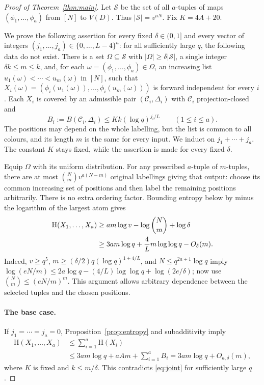 \documentclass[11pt,a4paper]{article}
\numberwithin{equation}{section}
\newcommand{\HH}{\mathrm H}
\newcommand{\cC}{\mathcal C}
\newcommand{\cS}{\mathcal S}
\begin{document}
\begin{proof}[Proof of Theorem~\ref{thm:main}]
Let $\cS$ be the set of all $a$-tuples of maps
$(\phi_1,\ldots,\phi_a)$ from $[N]$ to $V(D)$.
Thus $|\cS|=v^{aN}$.
Fix $K=4A+20$.

We prove the following assertion for every fixed
$\delta\in(0,1]$ and every vector of integers
$(j_1,\ldots,j_a)\in\{0,\ldots,L-4\}^a$:
for all sufficiently large $q$, the following data do not exist.
There is a set $\Omega\subseteq\cS$ with
$|\Omega|\ge\delta|\cS|$, a single integer
$\delta k\le m\le k$, and, for each
$\omega=(\phi_1,\ldots,\phi_a)\in\Omega$, an increasing
list $u_1(\omega)<\cdots<u_m(\omega)$ in $[N]$, such that
$X_i(\omega)=(\phi_i(u_1(\omega)),\ldots,
\phi_i(u_m(\omega)))$ is forward independent for every $i$.
Each $X_i$ is covered by an admissible pair
$(\cC_i,\Delta_i)$ with $\cC_i$ projection-closed and
\begin{equation}\label{eq:bounds}
 B_i:=B(\cC_i,\Delta_i)
 \le Kk(\log q)^{j_i/L}\qquad(1\le i\le a).
\end{equation}
The positions may depend on the whole labelling, but the list
is common to all colours, and its length $m$ is the same for
every input. We induct on $j_1+\cdots+j_a$.
The constant $K$ stays fixed, while the assertion is made for
every fixed $\delta$.

Equip $\Omega$ with its uniform distribution.
For any prescribed $a$-tuple of $m$-tuples, there are at most
$\binom Nm v^{a(N-m)}$ original labellings giving that output:
choose its common increasing set of positions and then label
the remaining positions arbitrarily.
There is no extra ordering factor. Bounding entropy below by
minus the logarithm of the largest atom gives
\begin{align}
 \HH(X_1,\ldots,X_a)
 &\ge am\log v-\log\binom Nm+\log\delta\notag\\
 &\ge3am\log q+\frac4L m\log\log q-O_\delta(m).
 \label{eq:joint}
\end{align}
Indeed, $v\ge q^5$,
$m\ge(\delta/2)q(\log q)^{1+4/L}$, and
$N\le q^{2a+1}\log q$ imply
$\log(eN/m)\le2a\log q-(4/L)\log\log q+\log(2e/\delta)$;
now use $\binom Nm\le(eN/m)^m$.
This argument allows arbitrary dependence between the selected
tuples and the chosen positions.

\paragraph{The base case.}
If $j_1=\cdots=j_a=0$, Proposition~\ref{prop:entropy} and
subadditivity imply
\[
 \begin{aligned}
 \HH(X_1,\ldots,X_a)
 &\le\sum_{i=1}^a\HH(X_i)\\
 &\le3am\log q+aAm+\sum_{i=1}^aB_i
 =3am\log q+O_{a,\delta}(m),
 \end{aligned}
\]
where $K$ is fixed and $k\le m/\delta$.
This contradicts \eqref{eq:joint} for sufficiently large $q$.


\end{proof}
\end{document}
